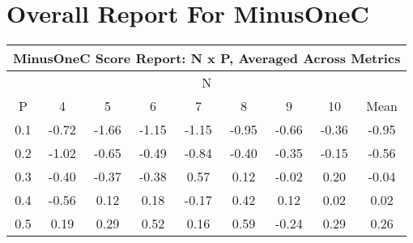 \documentclass[11pt,a4paper]{report}
\begin{document}
\chapter{Overall Report For MinusOneC}
\begin{longtable}{ | c || c | c | c | c | c | c | c || c |}
\hline
\multicolumn{9}{|c|}{ MinusOneC Score Report: N x P, Averaged Across Metrics } \\
\hline
\multicolumn{9}{|c|}{ N } \\
\hline
P & 4 & 5 & 6 & 7 & 8 & 9 & 10 & Mean\\
\hline
\hline
\endhead
0.1 &  \cellcolor[HTML]{FFEFEF} -0.72 &  \cellcolor[HTML]{FFD7D7} -1.66 &  \cellcolor[HTML]{FFDFDF} -1.15 &  \cellcolor[HTML]{FFDFDF} -1.15 &  \cellcolor[HTML]{FFE7E7} -0.95 &  \cellcolor[HTML]{FFEFEF} -0.66 &  \cellcolor[HTML]{FFF7F7} -0.36 &  \cellcolor[HTML]{FFE7E7} -0.95 \\
0.2 &  \cellcolor[HTML]{FFE7E7} -1.02 &  \cellcolor[HTML]{FFEFEF} -0.65 &  \cellcolor[HTML]{FFEFEF} -0.49 &  \cellcolor[HTML]{FFE7E7} -0.84 &  \cellcolor[HTML]{FFF7F7} -0.40 &  \cellcolor[HTML]{FFF7F7} -0.35 &  \cellcolor[HTML]{FFFFFF} -0.15 &  \cellcolor[HTML]{FFEFEF} -0.56 \\
0.3 &  \cellcolor[HTML]{FFF7F7} -0.40 &  \cellcolor[HTML]{FFF7F7} -0.37 &  \cellcolor[HTML]{FFF7F7} -0.38 &  \cellcolor[HTML]{EFEFFF} 0.57 &  \cellcolor[HTML]{FFFFFF} 0.12 &  \cellcolor[HTML]{FFFFFF} -0.02 &  \cellcolor[HTML]{F7F7FF} 0.20 &  \cellcolor[HTML]{FFFFFF} -0.04 \\
0.4 &  \cellcolor[HTML]{FFEFEF} -0.56 &  \cellcolor[HTML]{FFFFFF} 0.12 &  \cellcolor[HTML]{F7F7FF} 0.18 &  \cellcolor[HTML]{FFF7F7} -0.17 &  \cellcolor[HTML]{F7F7FF} 0.42 &  \cellcolor[HTML]{FFFFFF} 0.12 &  \cellcolor[HTML]{FFFFFF} 0.02 &  \cellcolor[HTML]{FFFFFF} 0.02 \\
0.5 &  \cellcolor[HTML]{F7F7FF} 0.19 &  \cellcolor[HTML]{F7F7FF} 0.29 &  \cellcolor[HTML]{EFEFFF} 0.52 &  \cellcolor[HTML]{F7F7FF} 0.16 &  \cellcolor[HTML]{EFEFFF} 0.59 &  \cellcolor[HTML]{FFF7F7} -0.24 &  \cellcolor[HTML]{F7F7FF} 0.29 &  \cellcolor[HTML]{F7F7FF} 0.26 \\

\end{longtable}
\end{document}

